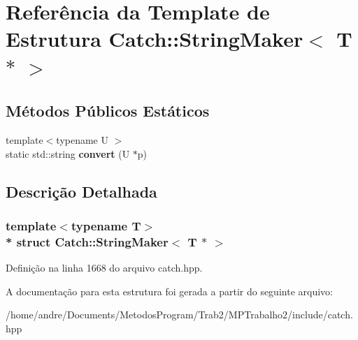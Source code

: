\hypertarget{structCatch_1_1StringMaker_3_01T_01_5_01_4}{}\section{Referência da Template de Estrutura Catch\+:\+:String\+Maker$<$ T $\ast$ $>$}
\label{structCatch_1_1StringMaker_3_01T_01_5_01_4}
\subsection*{Métodos Públicos Estáticos}
\begin{DoxyCompactItemize}
\item 
{\footnotesize template$<$typename U $>$ }\\static std\+::string {\bfseries convert} (U $\ast$p)\hypertarget{structCatch_1_1StringMaker_3_01T_01_5_01_4_a2adbc75c99d71b8323f4052bcb0815c9}{}\label{structCatch_1_1StringMaker_3_01T_01_5_01_4_a2adbc75c99d71b8323f4052bcb0815c9}

\end{DoxyCompactItemize}


\subsection{Descrição Detalhada}
\subsubsection*{template$<$typename T$>$\\*
struct Catch\+::\+String\+Maker$<$ T $\ast$ $>$}



Definição na linha 1668 do arquivo catch.\+hpp.



A documentação para esta estrutura foi gerada a partir do seguinte arquivo\+:\begin{DoxyCompactItemize}
\item 
/home/andre/\+Documents/\+Metodos\+Program/\+Trab2/\+M\+P\+Trabalho2/include/catch.\+hpp\end{DoxyCompactItemize}
